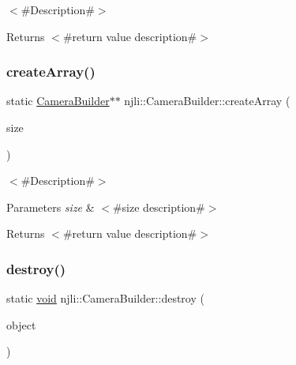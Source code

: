 $<$\#\+Description\#$>$

\begin{DoxyReturn}{Returns}
$<$\#return value description\#$>$ 
\end{DoxyReturn}
\mbox{\label{classnjli_1_1_camera_builder_aedcc9f2ff4a35d86c562ec08fe2d08d0}} 
\subsubsection{\texorpdfstring{create\+Array()}{createArray()}}
{\footnotesize\ttfamily static \mbox{\hyperlink{classnjli_1_1_camera_builder}{Camera\+Builder}}$\ast$$\ast$ njli\+::\+Camera\+Builder\+::create\+Array (\begin{DoxyParamCaption}\item[{const \mbox{\hyperlink{_util_8h_a10e94b422ef0c20dcdec20d31a1f5049}{u32}}}]{size }\end{DoxyParamCaption})\hspace{0.3cm}{\ttfamily [static]}}

$<$\#\+Description\#$>$


\begin{DoxyParams}{Parameters}
{\em size} & $<$\#size description\#$>$\\
\hline
\end{DoxyParams}
\begin{DoxyReturn}{Returns}
$<$\#return value description\#$>$ 
\end{DoxyReturn}
\mbox{\label{classnjli_1_1_camera_builder_a787c5a9f6c3b698c9d099af8b6d41d7c}} 
\subsubsection{\texorpdfstring{destroy()}{destroy()}}
{\footnotesize\ttfamily static \mbox{\hyperlink{_thread_8h_af1e856da2e658414cb2456cb6f7ebc66}{void}} njli\+::\+Camera\+Builder\+::destroy (\begin{DoxyParamCaption}\item[{\mbox{\hyperlink{classnjli_1_1_camera_builder}{Camera\+Builder}} $\ast$}]{object }\end{DoxyParamCaption})\hspace{0.3cm}{\ttfamily [static]}}

